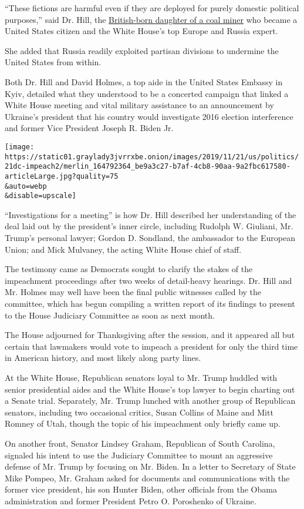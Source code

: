 ``These fictions are harmful even if they are deployed for purely
domestic political purposes,'' said Dr. Hill, the
\href{https://www.nytimes3xbfgragh.onion/2019/11/21/us/politics/who-is-fiona-hill.html}{British-born
daughter of a coal miner} who became a United States citizen and the
White House's top Europe and Russia expert.

She added that Russia readily exploited partisan divisions to undermine
the United States from within.

Both Dr. Hill and David Holmes, a top aide in the United States Embassy
in Kyiv, detailed what they understood to be a concerted campaign that
linked a White House meeting and vital military assistance to an
announcement by Ukraine's president that his country would investigate
2016 election interference and former Vice President Joseph R. Biden Jr.

\texttt{[image: https://static01.graylady3jvrrxbe.onion/images/2019/11/21/us/politics/21dc-impeach2/merlin\_164792364\_be9a3c27-b7af-4cb8-90aa-9a2fbc617580-articleLarge.jpg?quality=75\\\&auto=webp\\\&disable=upscale]}

``Investigations for a meeting'' is how Dr. Hill described her
understanding of the deal laid out by the president's inner circle,
including Rudolph W. Giuliani, Mr. Trump's personal lawyer; Gordon D.
Sondland, the ambassador to the European Union; and Mick Mulvaney, the
acting White House chief of staff.

The testimony came as Democrats sought to clarify the stakes of the
impeachment proceedings after two weeks of detail-heavy hearings. Dr.
Hill and Mr. Holmes may well have been the final public witnesses called
by the committee, which has begun compiling a written report of its
findings to present to the House Judiciary Committee as soon as next
month.

The House adjourned for Thanksgiving after the session, and it appeared
all but certain that lawmakers would vote to impeach a president for
only the third time in American history, and most likely along party
lines.

At the White House, Republican senators loyal to Mr. Trump huddled with
senior presidential aides and the White House's top lawyer to begin
charting out a Senate trial. Separately, Mr. Trump lunched with another
group of Republican senators, including two occasional critics, Susan
Collins of Maine and Mitt Romney of Utah, though the topic of his
impeachment only briefly came up.

On another front, Senator Lindsey Graham, Republican of South Carolina,
signaled his intent to use the Judiciary Committee to mount an
aggressive defense of Mr. Trump by focusing on Mr. Biden. In a letter to
Secretary of State Mike Pompeo, Mr. Graham asked for documents and
communications with the former vice president, his son Hunter Biden,
other officials from the Obama administration and former President Petro
O. Poroshenko of Ukraine.

